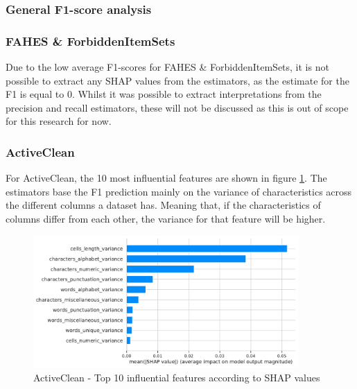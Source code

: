 \subsubsection{General F1-score analysis}



\subsubsection{FAHES \& ForbiddenItemSets}
Due to the low average F1-scores for FAHES \& ForbiddenItemSets, it is not possible to extract any SHAP values from the estimators, as the estimate for the F1 is equal to 0. Whilst it was possible to extract interpretations from the precision and recall estimators, these will not be discussed as this is out of scope for this research for now.

\subsubsection{ActiveClean}
For ActiveClean, the 10 most influential features are shown in figure \ref{fig:most_impact_features_activeclean}. The estimators base the F1 prediction mainly on the variance of characteristics across the different columns a dataset has. Meaning that, if the characteristics of columns differ from each other, the variance for that feature will be higher.

\begin{figure}[H]
    \centering
    \includegraphics[width=0.9\textwidth]{thesis/Figures/RQ4/Shap_ActiveClean.pdf}
    \caption{ActiveClean - Top 10 influential features according to SHAP values}
    \label{fig:most_impact_features_activeclean}
\end{figure}

